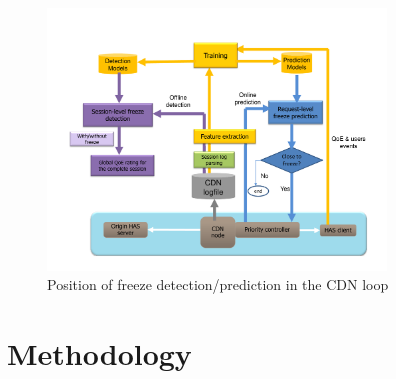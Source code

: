 \documentclass[journal]{IEEEtran}
\begin{document}
\begin{figure}[!t]
\begin{center}
\includegraphics[width=90mm] {graphs/positioning.pdf}
\caption{Position of freeze detection/prediction in the CDN loop}
\label{fig:positioning}
\end{center}
\end{figure}

\section{Methodology}
\end{document}
